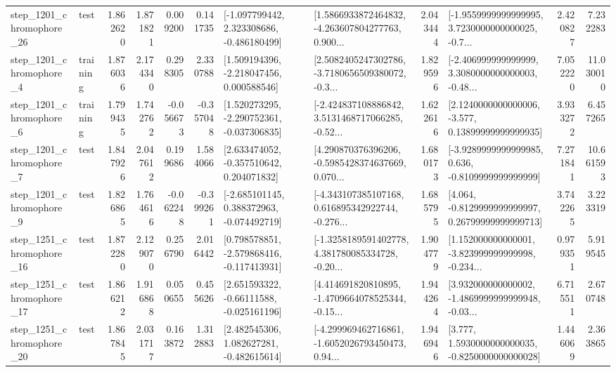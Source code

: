 \begin{tabular}{llrrrrllrlrr}
 step\_1201\_chromophore\_26 &      test &      1.862620 &    1.871821 &      0.009200 &  0.141735 &   [-1.097799442, 2.323308686, -0.486180499] &  [1.5866933872464832, -4.263607804277763, 0.900... &       2.043444 &  [-1.9559999999999995, 3.7230000000000025, -0.7... &            2.420827 &          7.232283 \\
  step\_1201\_chromophore\_4 &  training &      1.876036 &    2.174340 &      0.298305 &  2.330788 &    [1.509194396, -2.218047456, 0.000588546] &  [2.5082405247302786, -3.7180656509380072, -0.3... &       1.829596 &  [-2.406999999999999, 3.3080000000000003, -0.48... &            7.052220 &         11.030010 \\
  step\_1201\_chromophore\_6 &  training &      1.799435 &    1.742762 &     -0.056673 & -0.357048 &   [1.520273295, -2.290752361, -0.037306835] &  [-2.424837108886842, 3.5131468717066285, -0.52... &       1.622616 &  [2.1240000000000006, -3.577, 0.13899999999999935] &            3.933272 &          6.457265 \\
  step\_1201\_chromophore\_7 &      test &      1.847926 &    2.047612 &      0.199686 &  1.584066 &    [2.633474052, -0.357510642, 0.204071832] &  [4.290870376396206, -0.5985428374637669, 0.070... &       1.680173 &  [-3.9289999999999985, 0.636, -0.8109999999999999] &            7.271841 &         10.661593 \\
  step\_1201\_chromophore\_9 &      test &      1.826865 &    1.764616 &     -0.062248 & -0.399261 &   [-2.685101145, 0.388372963, -0.074492719] &  [-4.343107385107168, 0.616895342922744, -0.276... &       1.685795 &  [4.064, -0.8129999999999997, 0.26799999999999713] &            3.742265 &          3.223319 \\
 step\_1251\_chromophore\_16 &      test &      1.872280 &    2.129070 &      0.256790 &  2.016442 &   [0.798578851, -2.579868416, -0.117413931] &  [-1.3258189591402778, 4.381780085334728, -0.20... &       1.904779 &  [1.152000000000001, -3.823999999999998, -0.234... &            0.979351 &          5.919545 \\
 step\_1251\_chromophore\_17 &      test &      1.866212 &    1.916868 &      0.050655 &  0.455626 &    [2.651593322, -0.66111588, -0.025161196] &  [4.414691820810895, -1.4709664078525344, -0.15... &       1.944264 &  [3.932000000000002, -1.4869999999999948, -0.03... &            6.715511 &          2.670748 \\
 step\_1251\_chromophore\_20 &      test &      1.867845 &    2.031717 &      0.163872 &  1.312883 &    [2.482545306, 1.082627281, -0.482615614] &  [-4.299969462716861, -1.6052026793450473, 0.94... &       1.946946 &   [3.777, 1.5930000000000035, -0.8250000000000028] &            1.446069 &          2.363865 \\

\end{tabular}
